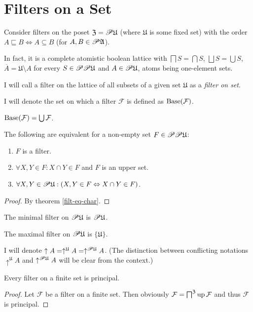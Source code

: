\section{Filters on a Set}

Consider filters on the poset $\mathfrak{Z}=\mathscr{P}\mathfrak{U}$
(where $\mathfrak{U}$ is some fixed set) with the order $A\sqsubseteq B\Leftrightarrow A\subseteq B$
(for $A,B\in\mathscr{P}\mathfrak{A}$).

In fact, it is a complete atomistic boolean lattice with $\bigsqcap S=\bigcap S$,
$\bigsqcup S=\bigcup S$, $\overline{A}=\mathfrak{U}\setminus A$
for every $S\in\mathscr{P}\mathscr{P}\mathfrak{U}$ and $A\in\mathscr{P}\mathfrak{U}$,
atoms being one-element sets.
\begin{defn}
I will call a filter
on the lattice of all subsets of a given set $\mathfrak{U}$ as a
\emph{filter on set}.
\end{defn}

\begin{defn}
I will denote the set on which a filter $\mathcal{F}$ is defined
as $\operatorname{Base}(\mathcal{F})$.\end{defn}
\begin{obvious}
$\operatorname{Base}(\mathcal{F})=\bigcup\mathcal{F}$.\end{obvious}
\begin{prop}
The following are equivalent for a non-empty set $F\in\mathscr{P}\mathscr{P}\mathfrak{U}$:
\begin{enumerate}
\item $F$ is a filter.
\item $\forall X,Y\in F:X\cap Y\in F$ and $F$ is an upper set.
\item $\forall X,Y\in\mathscr{P}\mathfrak{U}:(X,Y\in F\Leftrightarrow X\cap Y\in F)$.
\end{enumerate}
\end{prop}
\begin{proof}
By theorem \ref{filt-eq-char}.\end{proof}
\begin{obvious}
The minimal filter on $\mathscr{P}\mathfrak{U}$ is $\mathscr{P}\mathfrak{U}$.
\end{obvious}

\begin{obvious}
The maximal filter on $\mathscr{P}\mathfrak{U}$ is $\{\mathfrak{U}\}$.
\end{obvious}
I will denote $\uparrow A=\uparrow^{\mathfrak{U}}A=\uparrow^{\mathscr{P}\mathfrak{U}}A$.
(The distinction between conflicting notations $\uparrow^{\mathfrak{U}}A$
and $\uparrow^{\mathscr{P}\mathfrak{U}}A$ will be clear from the context.)
\begin{prop}
Every filter on a finite set is principal.\end{prop}
\begin{proof}
Let $\mathcal{F}$ be a filter on a finite set. Then obviously $\mathcal{F}=\bigsqcap^{\mathfrak{Z}}\operatorname{up}\mathcal{F}$
and thus $\mathcal{F}$ is principal.
\end{proof}

